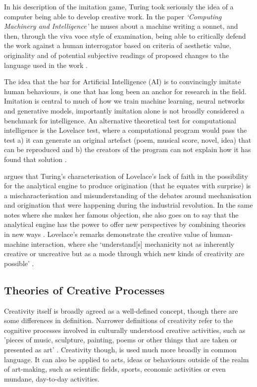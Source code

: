 In his description of the imitation game, Turing took seriously the idea of a computer being able to develop creative work. 
In the paper \textit{`Computing Machinery and Intelligence'} he muses about a machine writing a sonnet, and then, through the viva voce style of examination, being able to critically defend the work against a human interrogator based on criteria of aesthetic value, originality and of potential subjective readings of proposed changes to the language used in the work \citep{machinery1950computing}.

The idea that the bar for Artificial Intelligence (AI) is to convincingly imitate human behaviours, is one that has long been an anchor for research in the field. 
Imitation is central to much of how we train machine learning, neural networks and generative models, importantly imitation alone is not broadly considered a benchmark for intelligence.
An alternative theoretical test for computational intelligence is the Lovelace test, where a computational program would pass the test a) it can generate an original artefact (poem, musical score, novel, idea) that can be reproduced and b) the creators of the program can not explain how it has found that solution \citep{bringsjord2003creativity}. 

\cite{ward2020computational} argues that Turing's characterisation of Lovelace's lack of faith in the possibility for the analytical engine to produce origination (that he equates with surprise) is a mischaracterisation and misunderstanding of the debates around mechanisation and origination that were happening during the industrial revolution. 
In the same notes where she makes her famous objection, she also goes on to say that the analytical engine has the power to offer new perspectives by combining theories in new ways \citep{lovelace1843notes}.
 Lovelace's remarks demonstrate the creative value of human-machine interaction, where she `understand[s] mechanicity not as inherently creative or uncreative but as a mode through which new kinds of creativity are possible' \citep{ward2020computational}.

\subsection{Theories of Creative Processes}

Creativity itself is broadly agreed as a well-defined concept, though there are some differences in definition. 
Narrower definitions of creativity refer to the cognitive processes involved in culturally understood creative activities, such as 'pieces of music, sculpture, painting, poems or other things that are taken or presented as art' \citep{wiggins2015evolutionary}.
Creativity though, is used much more broadly in common language. 
It can also be applied to acts, ideas or behaviours outside of the realm of art-making, such as scientific fields, sports, economic activities or even mundane, day-to-day activities.


